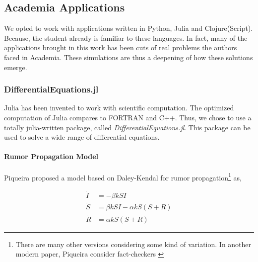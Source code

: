 \documentclass[
12pt,				%
openright,			%
oneside,			%
a4paper,			%
brazil,				%
english,			  %
]{abntex2}
\begin{document}
\subsection{Academia Applications}
\label{subsec:res-academia}

We opted to work with applications written in Python, Julia and
Clojure(Script). Because, the student already is familiar to these
languages. In fact, many of the applications brought in this work has
been cuts of real problems the authors faced in Academia. These
simulations are thus a deepening of how these solutions emerge.

\subsubsection{DifferentialEquations.jl}
Julia has been invented to work with scientific computation. The
optimized computation of Julia compares to FORTRAN and C++. Thus, we
chose to use a totally julia-written package, called
\textit{DifferentialEquations.jl}. This package can be used to solve a wide
range of differential equations.

\paragraph{Rumor Propagation Model}

Piqueira \cite{piqueira2010rumor} proposed a model based on Daley-Kendal \cite{daley1964epidemics} for rumor propagation\footnote{There are many other versions considering some kind of variation. In another modern paper, Piqueira consider fact-checkers \cite{piqueira2020daley}} as, 

\begin{equation}
  \begin{align*}
    \dot{I} &= − \beta k SI \\
    \dot{S} &= \beta kSI - \alpha kS (S+R)\\
    \dot{R} &= \alpha k S(S+R)
  \end{align*}
\end{equation}
\end{document}

